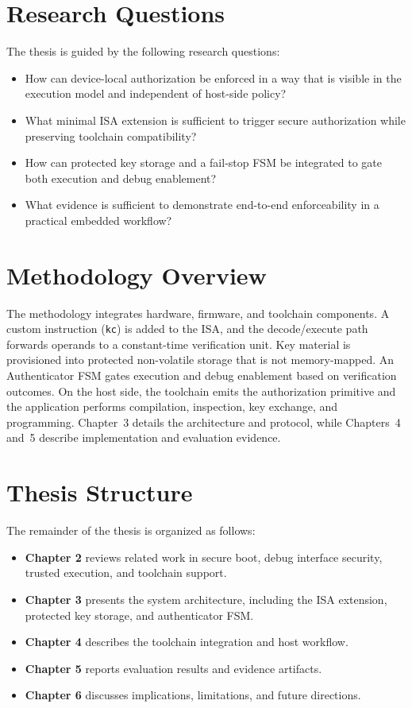 \section{Research Questions}
The thesis is guided by the following research questions:
\begin{itemize}
  \item How can device-local authorization be enforced in a way that is visible in the
        execution model and independent of host-side policy?
  \item What minimal ISA extension is sufficient to trigger secure authorization while
        preserving toolchain compatibility?
  \item How can protected key storage and a fail-stop FSM be integrated to gate both
        execution and debug enablement?
  \item What evidence is sufficient to demonstrate end-to-end enforceability in a
        practical embedded workflow?
\end{itemize}

\section{Methodology Overview}
The methodology integrates hardware, firmware, and toolchain components. A custom
instruction (\texttt{kc}) is added to the ISA, and the decode/execute path forwards
operands to a constant-time verification unit. Key material is provisioned into
protected non-volatile storage that is not memory-mapped. An Authenticator FSM gates
execution and debug enablement based on verification outcomes. On the host side, the
toolchain emits the authorization primitive and the application performs compilation,
inspection, key exchange, and programming. Chapter~3 details the architecture and
protocol, while Chapters~4 and~5 describe implementation and evaluation evidence.

\section{Thesis Structure}
The remainder of the thesis is organized as follows:
\begin{itemize}
  \item \textbf{Chapter 2} reviews related work in secure boot, debug interface
        security, trusted execution, and toolchain support.
  \item \textbf{Chapter 3} presents the system architecture, including the ISA
        extension, protected key storage, and authenticator FSM.
  \item \textbf{Chapter 4} describes the toolchain integration and host workflow.
  \item \textbf{Chapter 5} reports evaluation results and evidence artifacts.
  \item \textbf{Chapter 6} discusses implications, limitations, and future directions.
\end{itemize}

